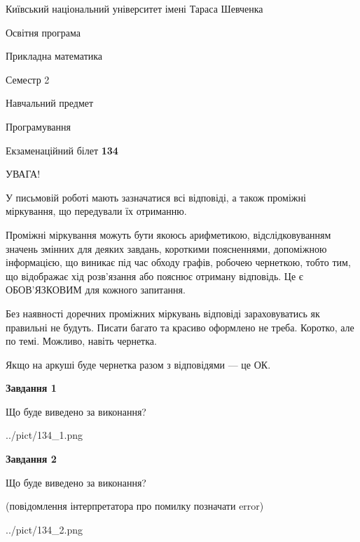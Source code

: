 \documentclass[12pt, ukrainian]{article}
\begin{document}
{{\begin {small}\par
{ \center  Київський національний університет імені Тараса Шевченка \par}
{\parbox {5 cm}{Освітня програма \hfill}{\parbox {7 cm}{Прикладна математика\hfill}}\parbox {6 cm}{\hfill Семестр 2}}\par
{\parbox {5 cm} {Навчальний предмет \hfill}\parbox {7 cm}{Програмування \hfill}\parbox {6cm}{\hfill}\par}\vspace{-7pt} \end{small}}{\center Екзаменаційний білет \No \textbf
{ 134 }\par}}
{
\begin {large}
УВАГА!

У письмовій роботі мають зазначатися всі відповіді, а також проміжні міркування, що передували їх отриманню.

Проміжні міркування можуть бути якоюсь арифметикою, відслідковуванням зна\-чень змінних для деяких завдань,
короткими поясненнями, допоміжною інформацією, що виникає під час обходу графів, робочею чернеткою,
тобто тим, що відображає хід розв’язання або пояснює отриману відповідь.
Це є ОБОВ’ЯЗКОВИМ для кожного запитання.

Без наявності доречних проміжних міркувань відповіді зараховуватись як правиль\-ні не будуть.
Писати багато та красиво оформлено не треба. Коротко, але по темі. Можли\-во, навіть чернетка.

Якщо на аркуші буде чернетка разом з відповідями --- це ОК.

\newpage

{\begin {center}\textbf{Завдання 1}\end {center}}\par
Що буде виведено за виконання?\par
\begin{center}
	{../pict/134_1.png}
\end{center}
\newpage

{\begin {center}\textbf{Завдання 2}\end {center}}\par
Що буде виведено за виконання?\par
 (повідомлення інтерпретатора про помилку позначати error)\par
\begin{center}
	{../pict/134_2.png}
\end{center}
\newpage


\end{large}}
\end{document}
